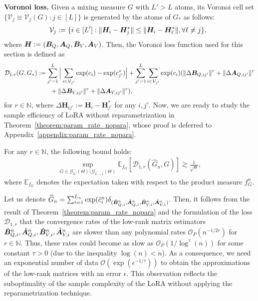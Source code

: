 \vspace{0.5 em}
\noindent
\textbf{Voronoi loss.}  Given a mixing measure $G$ with $L'>L$ atoms, its Voronoi cell set $\{\mathcal{V}_{j}\equiv\mathcal{V}_{j}(G):j\in[L]\}$
is generated by the atoms of $G_*$ as follows:
\begin{align*}
    \hspace{-0.5em}\mathcal{V}_{j}:=\{i\in[L']:\|{\bm H}_{i}-{\bm H}^*_{j}\|\leq\|{\bm H}_{i}-{\bm H}^*_{\ell}\|,\forall \ell\neq j\},
\end{align*}
where ${\bm H}:=({\bm B}_Q,{\bm A}_Q,{\bm B}_V,{\bm A}_V)$. Then, the Voronoi loss function used for this section is  defined as
\begin{align*}     
&\mathcal{D}_{1,r}(G,G_*)  :=\sum_{j'=1}^{L}\Big|\sum_{i\in\mathcal{V}_{j'}}\exp(c_{i})-\exp(c^*_{j'})\Big| + \sum_{j'=1}^{L}\sum_{i\in\mathcal{V}_{j'}}\exp(c_{i}) (\|\Delta {\bm B}_{Q,ij'}\|^r +\|\Delta {\bm A}_{Q,ij'}\|^r\\
&\hspace{2.5cm}+\|\Delta {\bm B}_{V,ij'}\|^r +\|\Delta {\bm A}_{V,ij'}\|^r),
\end{align*}
for $r\in\mathbb{N}$, where $\Delta{\bm H}_{ij'}:={\bm H}_{i}-{\bm H}^*_{j'}$ for any $i, j'$. Now, we are ready to study the sample efficiency of LoRA without reparametrization in Theorem~\ref{theorem:param_rate_nopara}, whose proof is deferred to Appendix~\ref{appendix:param_rate_nopara}.
\begin{theorem}
    \label{theorem:param_rate_nopara}
    For any $r\in\mathbb{N}$, the following bound holds:
    \begin{align*}
        \sup_{G\in\mathcal{G}_{L'}(\Theta)\setminus\mathcal{G}_{L-1}(\Theta)}\mathbb{E}_{f_{G}}[\mathcal{D}_{1,r}(\widehat{G}_n,{G})]\gtrsim \frac{1}{\sqrt{n}},
    \end{align*}
     where $\mathbb{E}_{f_{G}}$ denotes the expectation taken with respect to the product measure $f^n_G$.
\end{theorem}
Let us denote $\widehat{G}_n=\sum_{i=1}^{L_n}\exp(\hat{c}^n_i)\delta_{(\hat{{\bm B}}^n_{Q,i},\hat{{\bm A}}^n_{Q,i},\hat{{\bm B}}^n_{V,i},\hat{{\bm A}}^n_{V,i})}$. Then, it follows from the result of Theorem~\ref{theorem:param_rate_nopara} and the formulation of the loss $\mathcal{D}_{1,r}$ that the convergence rates of the low-rank matrix estimators $\hat{{\bm B}}^n_{Q,i},\hat{{\bm A}}^n_{Q,i},\hat{{\bm B}}^n_{V,i},\hat{{\bm A}}^n_{V,i}$ are slower than any polynomial rates $\mathcal{O}_P(n^{-1/2r})$ for $r\in\mathbb{N}$. Thus, these rates could become as slow as $\mathcal{O}_P(1/\log^{\tau}(n))$ for some constant $\tau>0$ (due to the inequality $\log(n)<n$). As a consequence, we need an exponential number of data $\mathcal{O}(\exp(\epsilon^{-1/\tau}))$ to obtain the approximations of the low-rank matrices with an error $\epsilon$. This observation reflects the suboptimality of the sample complexity of the LoRA without applying the reparametrization technique.
